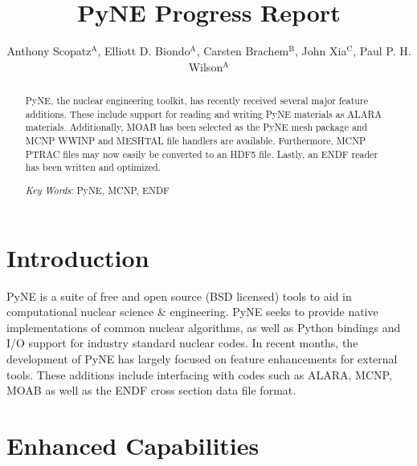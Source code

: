 \documentclass{ansconf}
\newcommand{\superscript}[1]{\ensuremath{^{\textrm{#1}}}}
\begin{document}
\title{PyNE Progress Report}

\author{Anthony Scopatz\superscript{A}, Elliott D. Biondo\superscript{A}, 
        Carsten Brachem\superscript{B}, John Xia\superscript{C}, 
        Paul P. H. Wilson\superscript{A}}

\maketitle

\begin{abstract}

PyNE, the nuclear engineering toolkit, has recently received several major
feature additions.  These include support for reading and writing PyNE materials 
as ALARA materials.  Additionally, MOAB has been selected as the PyNE mesh package
and MCNP WWINP and MESHTAL file handlers are available.  Furthermore, MCNP PTRAC files may now
easily be converted to an HDF5 file.  Lastly, an ENDF reader has been written and 
optimized.

\emph{Key Words}: PyNE, MCNP, ENDF
\end{abstract}

\setlength{\baselineskip}{11pt}


\section{Introduction}
\label{sec:intro}

PyNE is a suite of free and open source (BSD licensed) tools to aid in 
computational nuclear science \& engineering. PyNE seeks to provide native 
implementations of common nuclear algorithms, as well as Python bindings and 
I/O support for industry standard nuclear codes.  In recent months, the development 
of PyNE has largely focused on feature 
enhancements for external tools.  These additions include interfacing with 
codes such as ALARA, MCNP, MOAB as well as the ENDF cross section data
file format.

\section{Enhanced Capabilities}
\end{document}
